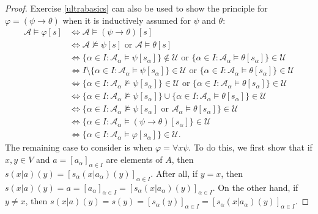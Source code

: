 \documentclass{article}
\def\A{\mathcal A}
\def\U{\mathscr U}
\begin{document}
\begin{proof}
Exercise \ref{ultrabasics} can also be used to show the principle for $\varphi=(\psi\to\theta)$ when it is inductively assumed for $\psi$ and $\theta$:
\begin{align*}
\A\models\varphi[s]
&\iff\A\models(\psi\to\theta)[s]\\
&\iff\A\not\models\psi[s]\text{ or }\A\models\theta[s]\\
&\iff\{\alpha\in I:\A_\alpha\models\psi[s_\alpha]\}\notin\U\text{ or }\{\alpha\in I:\A_\alpha\models\theta[s_\alpha]\}\in\U\\
&\iff I\setminus\{\alpha\in I:\A_\alpha\models\psi[s_\alpha]\}\in\U\text{ or }\{\alpha\in I:\A_\alpha\models\theta[s_\alpha]\}\in\U\\
&\iff\{\alpha\in I:\A_\alpha\not\models\psi[s_\alpha]\}\in\U\text{ or }\{\alpha\in I:\A_\alpha\models\theta[s_\alpha]\}\in\U\\
&\iff\{\alpha\in I:\A_\alpha\not\models\psi[s_\alpha]\}\cup\{\alpha\in I:\A_\alpha\models\theta[s_\alpha]\}\in\U\\
&\iff\{\alpha\in I:\A_\alpha\not\models\psi[s_\alpha]\text{ or }\A_\alpha\models\theta[s_\alpha]\}\in\U\\
&\iff\{\alpha\in I:\A_\alpha\models(\psi\to\theta)[s_\alpha]\}\in\U\\
&\iff\{\alpha\in I:\A_\alpha\models\varphi[s_\alpha]\}\in\U.
\end{align*}
The remaining case to consider is when $\varphi=\forall x\psi$.  To do this, we first show that if $x,y\in V$ and $a=[a_\alpha]_{\alpha\in I}$ are elements of $A$, then $s(x|a)(y)=[s_\alpha(x|a_\alpha)(y)]_{\alpha\in I}$.  After all, if $y=x$, then $s(x|a)(y)=a=[a_\alpha]_{\alpha\in I}=[s_\alpha(x|a_\alpha)(y)]_{\alpha\in I}$.  On the other hand, if $y\ne x$, then $s(x|a)(y)=s(y)=[s_\alpha(y)]_{\alpha\in I}=[s_\alpha(x|a_\alpha)(y)]_{\alpha\in I}$.


\end{proof}
\end{document}

